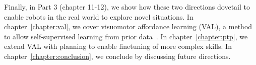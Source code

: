 Finally, in Part 3 (chapter 11-12), we show how these two directions dovetail to enable robots in the real world to explore novel situations. In chapter~\ref{chapter:val}, we cover visuomotor affordance learning (VAL), a method to allow self-supervised learning from prior data~\citep{Khazatsky2021WhatCI}. In chapter~\ref{chapter:ptp}, we extend VAL with planning to enable finetuning of more complex skills. In chapter~\ref{chapter:conclusion}, we conclude by discussing future directions.




